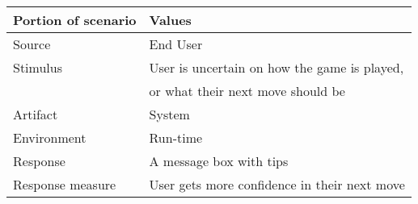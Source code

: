 \begin{itemize}
        \begin{tabular}{| l | l |}
            \hline
            \rowcolor[gray]{0.8}
            \textbf{Portion of scenario} & \textbf{Values} \\
            \hline
            Source & End User \\
            Stimulus & User is uncertain on how the game is played, \\
             & or what their next move should be \\
            Artifact & System \\
            Environment & Run-time \\
            Response & A message box with tips \\
            Response measure & User gets more confidence in their next move \\
            \hline
        \end{tabular}
    \end{itemize}